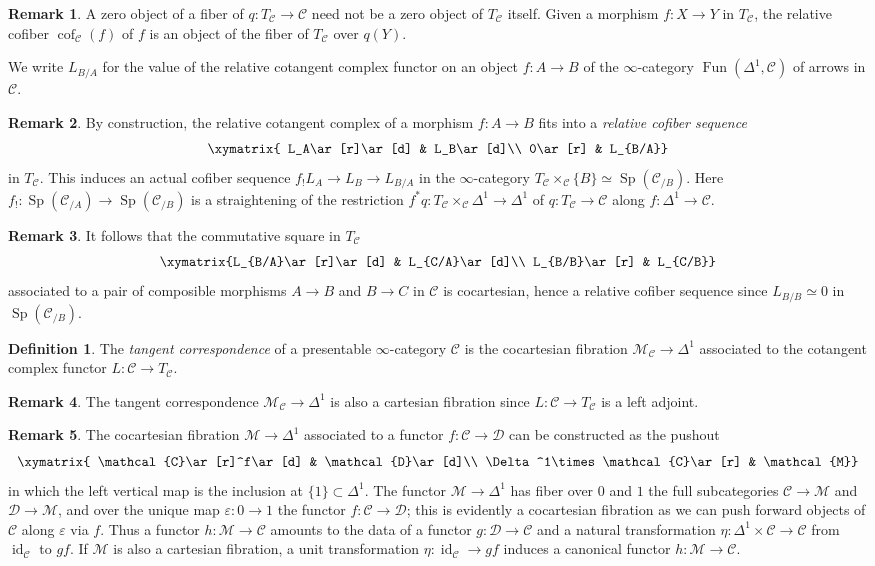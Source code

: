\documentclass[12pt]{article}
\theoremstyle{definition}
\newtheorem{definition}{Definition}[subsection]
\newtheorem{remark}{Remark}[subsection]
\newcommand{\C}{\mathcal{C}}
\newcommand{\D}{\mathcal{D}}
\newcommand{\M}{\mathcal{M}}
\renewcommand{\i}{\infty}
\DeclareMathOperator{\cof}{cof}
\DeclareMathOperator{\Fun}{Fun}
\DeclareMathOperator{\id}{id}
\DeclareMathOperator{\Sp}{Sp}
\renewcommand{\epsilon}{\varepsilon}
\begin{document}
\begin{remark}
A zero object of a fiber of $q:T_\C\to\C$ need not be a zero object of $T_\C$ itself.
Given a morphism $f:X\to Y$ in $T_\C$, the relative cofiber $\cof_\C(f)$ of $f$ is an object of the fiber  of $T_\C$ over $q(Y)$.
\end{remark}
We write $L_{B/A}$ for the value of the relative cotangent complex functor on an object $f:A\to B$ of the $\i$-category $\Fun(\Delta^1,\C)$ of arrows in $\C$.
\begin{remark}
By construction, the relative cotangent complex of a morphism $f:A\to B$ fits into a {\em relative cofiber sequence}
\[
\xymatrix{
L_A\ar[r]\ar[d] & L_B\ar[d]\\
0\ar[r] & L_{B/A}}
\]
in  $T_\C$.
This induces an actual cofiber sequence $f_! L_A\to L_B\to L_{B/A}$ in the $\i$-category $T_\C\times_{\C}\{B\}\simeq\Sp(\C_{/B})$.
Here $f_!:\Sp(\C_{/A})\to\Sp(\C_{/B})$ is a straightening of the restriction $f^*q:T_\C\times_\C\Delta^1\to\Delta^1$ of $q:T_\C\to\C$ along $f:\Delta^1\to\C$.
\end{remark}

\begin{remark}
It follows that the commutative square in $T_\C$
\[
\xymatrix{L_{B/A}\ar[r]\ar[d] & L_{C/A}\ar[d]\\
L_{B/B}\ar[r] & L_{C/B}}
\]
associated to a pair of composible morphisms $A\to B$ and $B\to C$ in $\C$ is cocartesian, hence a relative cofiber sequence since $L_{B/B}\simeq 0$ in $\Sp(\C_{/B})$.
\end{remark}

\begin{definition}
The {\em tangent correspondence} of a presentable $\i$-category $\C$ is the cocartesian fibration $\M_\C\to\Delta^1$ associated to the cotangent complex functor $L:\C\to T_\C$.
\end{definition}
\begin{remark}
The tangent correspondence $\M_\C\to\Delta^1$ is also a cartesian fibration since $L:\C\to T_\C$ is a left adjoint.
\end{remark}
\begin{remark}
The cocartesian fibration $\M\to\Delta^1$ associated to a functor $f:\C\to\D$ can be constructed as the pushout
\[
\xymatrix{
\C\ar[r]^f\ar[d] & \D\ar[d]\\
\Delta^1\times\C\ar[r] & \M}
\]
in which the left vertical map is the inclusion at $\{1\}\subset\Delta^1$.
The functor $\M\to\Delta^1$ has fiber over $0$ and $1$ the full subcategories $\C\to\M$ and $\D\to\M$, and over the unique map $\epsilon:0\to 1$ the functor $f:\C\to\D$; this is evidently a cocartesian fibration as we can push forward objects of $\C$ along $\epsilon$ via $f$.
Thus a functor $h:\M\to\C$ amounts to the data of a functor $g:\D\to\C$ and a natural transformation $\eta:\Delta^1\times\C\to\C$ from $\id_\C$ to $gf$.
If $\M$ is also a cartesian fibration, a unit transformation $\eta:\id_\C\to gf$ induces a canonical functor $h:\M\to\C$.
\end{remark}
\end{document}
